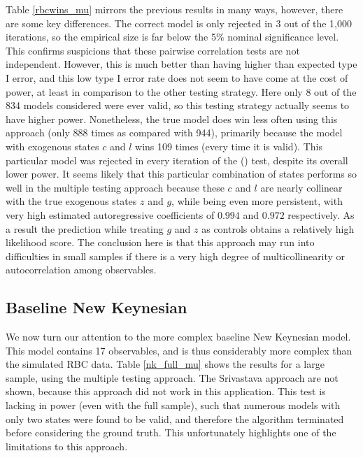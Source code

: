 \documentclass{article}
\begin{document}
Table \ref{rbcwins_mu} mirrors the previous results in many ways, however, there are some key differences. The correct model is only rejected in 3 out of the 1,000 iterations, so the empirical size is far below the 5\% nominal significance level. This confirms suspicions that these pairwise correlation tests are not independent. However, this is much better than having higher than expected type I error, and this low type I error rate does not seem to have come at the cost of power, at least in comparison to the other testing strategy. Here only 8 out of the 834 models considered were ever valid, so this testing strategy actually seems to have higher power. Nonetheless, the true model does win less often using this approach (only 888 times as compared with 944), primarily because the model with exogenous states $c$ and $l$ wins 109 times (every time it is valid). This particular model was rejected in every iteration of the \citeauthor{srivastava2005some} (\citeyear{srivastava2005some}) test, despite its overall lower power. It seems likely that this particular combination of states performs so well in the multiple testing approach because these $c$ and $l$ are nearly collinear with the true exogenous states $z$ and $g$, while being even more persistent, with very high estimated autoregressive coefficients of $0.994$ and $0.972$ respectively. As a result the prediction while treating $g$ and $z$ as controls obtains a relatively high likelihood score. The conclusion here is that this approach may run into difficulties in small samples if there is a very high degree of multicollinearity or autocorrelation among observables. 

\subsection{Baseline New Keynesian} \label{nk_results}

We now turn our attention to the more complex baseline New Keynesian model. This model contains 17 observables, and is thus considerably more complex than the simulated RBC data. Table \ref{nk_full_mu} shows the results for a large sample, using the multiple testing approach. The Srivastava approach are not shown, because this approach did not work in this application. This test is lacking in power (even with the full sample), such that numerous models with only two states were found to be valid, and therefore the algorithm terminated before considering the ground truth. This unfortunately highlights one of the limitations to this approach.
\end{document}
